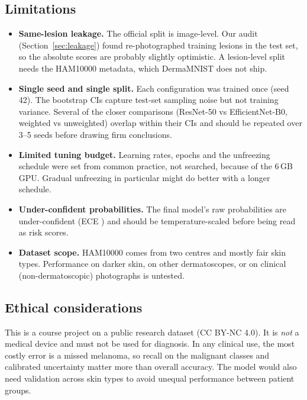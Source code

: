 \subsection{Limitations}
\label{sec:limitations}
\begin{itemize}
  \item \textbf{Same-lesion leakage.} The official split is image-level. Our audit (Section~\ref{sec:leakage})
        found re-photographed training lesions in the test set, so the absolute scores are probably slightly
        optimistic. A lesion-level split needs the HAM10000 metadata, which DermaMNIST does not ship.
  \item \textbf{Single seed and single split.} Each configuration was trained once (seed 42). The bootstrap CIs
        capture test-set sampling noise but not training variance. Several of the closer comparisons
        (ResNet-50 vs EfficientNet-B0, weighted vs unweighted) overlap within their CIs and should be repeated
        over 3--5 seeds before drawing firm conclusions.
  \item \textbf{Limited tuning budget.} Learning rates, epochs and the unfreezing schedule were set from common
        practice, not searched, because of the 6\,GB GPU. Gradual unfreezing in particular might do better with a
        longer schedule.
  \item \textbf{Under-confident probabilities.} The final model's raw probabilities are under-confident (ECE
        \RFineECETTA) and should be temperature-scaled before being read as risk scores.
  \item \textbf{Dataset scope.} HAM10000 comes from two centres and mostly fair skin types. Performance on darker
        skin, on other dermatoscopes, or on clinical (non-dermatoscopic) photographs is untested.
\end{itemize}

\subsection{Ethical considerations}
This is a course project on a public research dataset (CC BY-NC 4.0). It is \emph{not} a medical device and must
not be used for diagnosis. In any clinical use, the most costly error is a missed melanoma, so recall on the
malignant classes and calibrated uncertainty matter more than overall accuracy. The model would also need
validation across skin types to avoid unequal performance between patient groups.

